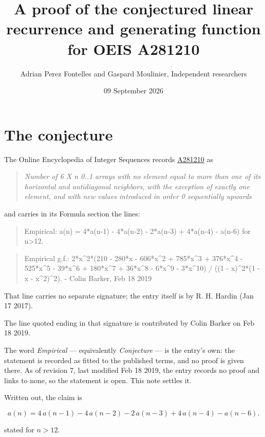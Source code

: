 \documentclass[11pt]{article}
\title{A proof of the conjectured linear recurrence and generating function for OEIS A281210}
\author{Adrian Perez Fontelles and Gaspard Moulinier, Independent researchers}
\date{09 September 2026}
\theoremstyle{definition}
\begin{document}
\maketitle
\section{The conjecture}

The Online Encyclopedia of Integer Sequences records \href{https://oeis.org/A281210}{A281210} as

\begin{quote}\itshape Number of 6 X n 0..1 arrays with no element equal to more than one of its horizontal and antidiagonal neighbors, with the exception of exactly one element, and with new values introduced in order 0 sequentially upwards\end{quote}

and carries in its Formula section the lines:

\begin{quote}\ttfamily Empirical: a(n) = 4*a(n-1) - 4*a(n-2) - 2*a(n-3) + 4*a(n-4) - a(n-6) for n>12.\end{quote}

\begin{quote}\ttfamily Empirical g.f.: 2*x\textasciicircum{}2*(210 - 280*x - 606*x\textasciicircum{}2 + 785*x\textasciicircum{}3 + 376*x\textasciicircum{}4 - 525*x\textasciicircum{}5 - 39*x\textasciicircum{}6 + 180*x\textasciicircum{}7 + 36*x\textasciicircum{}8 - 6*x\textasciicircum{}9 - 3*x\textasciicircum{}10) / ((1 - x)\textasciicircum{}2*(1 - x - x\textasciicircum{}2)\textasciicircum{}2). - Colin Barker, Feb 18 2019\end{quote}

That line carries no separate signature; the entry itself is by R. H. Hardin (Jan 17 2017).

The line quoted ending in that signature is contributed by Colin Barker on Feb 18 2019.

The word {\itshape Empirical} --- equivalently {\itshape Conjecture} --- is the entry's own: the statement is recorded as fitted to the published terms, and no proof is given there. As of revision 7, last modified Feb 18 2019, the entry records no proof and links to none, so the statement is open. This note settles it.

Written out, the claim is

\[a(n) = 4\,a(n-1) - 4\,a(n-2) - 2\,a(n-3) + 4\,a(n-4) - a(n-6).\]

stated for $n > 12$.
\end{document}
